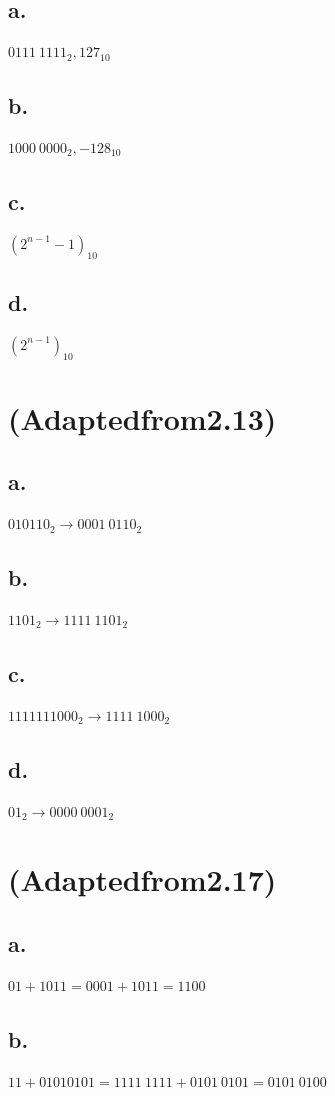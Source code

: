 \documentclass[11pt,a4paper]{article}
\begin{document}
	\subsection*{a.}
	$0111\ 1111_{2}, 127_{10}$
	\subsection*{b.}
	$1000\ 0000_{2}, -128_{10}$
	\subsection*{c.}
	$(2^{n-1}-1)_{10}$
	\subsection*{d.}
	$(2^{n-1})_{10}$
	
	
	
	\section{(Adaptedfrom2.13)}
	\subsection*{a.}
	$010110_{2} \rightarrow 0001\ 0110_{2}$
	\subsection*{b.}
	$1101_{2} \rightarrow 1111\ 1101_{2}$
	\subsection*{c.}
	$1111111000_{2} \rightarrow 1111\ 1000_{2}$
	\subsection*{d.}
	$01_{2} \rightarrow 0000\ 0001_{2}$
	
	
	
	\section{(Adaptedfrom2.17)}
	\subsection*{a.}
	$01+1011=0001+1011=1100$
	\subsection*{b.}
	$11+01010101=1111\ 1111+0101\ 0101=0101\ 0100$
\end{document}

